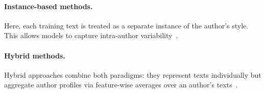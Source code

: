 \paragraph{Instance-based methods.} 
Here, each training text is treated as a separate instance of the author's style. 
This allows models to capture intra-author variability~\citep{stamatatos_survey_2009,altakrori_topic_2021,elmanarelbouanani_authorship_2014,neal_surveying_2018}.  

\paragraph{Hybrid methods.} 
Hybrid approaches combine both paradigms: they represent texts individually but aggregate author profiles via feature-wise averages over an author’s texts~\citep{stamatatos_survey_2009}. 
